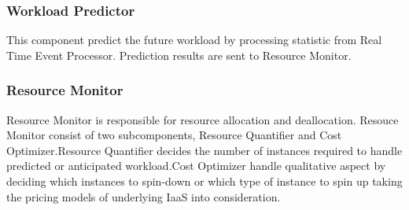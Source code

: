\subsubsection{Workload Predictor}
This component predict the future workload by processing statistic from Real Time Event Processor. Prediction results are sent to Resource Monitor.

\subsubsection{Resource Monitor}
Resource Monitor is responsible for resource allocation and deallocation. Resouce Monitor consist of two subcomponents, Resource Quantifier and Cost Optimizer.Resource Quantifier decides the number of instances required to handle predicted or anticipated workload.Cost Optimizer handle qualitative aspect by deciding which instances to spin-down or which type of instance to spin up taking the pricing models of underlying IaaS into consideration.